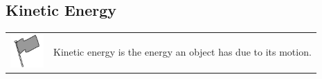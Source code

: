     \label{m38785*cid5}
            \subsection{ Kinetic Energy}
            \nopagebreak
            
      
\par
            \label{m38785*fhsst!!!underscore!!!id1048}\begin{definition}
	  \begin{tabular*}{15 cm}{m{15 mm}m{}}
	\hspace*{-50pt}  \includegraphics[width=0.5in]{col11305.imgs/psflag2.png}   & \Definition{   \label{id2553759}\textbf{ Kinetic Energy }} { \label{m38785*meaningfhsst!!!underscore!!!id1048}
      \label{m38785*id66784}Kinetic energy is the energy an object has due to its motion. \par 
       } 
      \end{tabular*}
      \end{definition}

